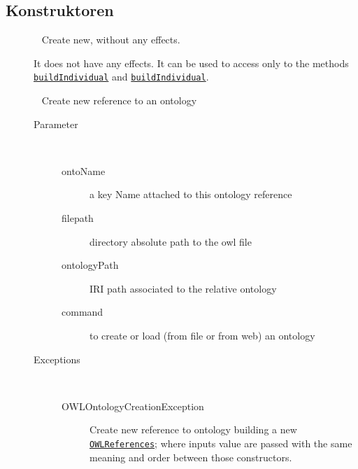 \subsection{Konstruktoren}
\begin{description}
\item[{\label{ontologyFramework.OFRunning.OFInitialising.OFInitialiser()}}]
~ Create new, without any effects.
 
 It does not have any effects. It can be used to access only to the methods
 \texttt{\hyperlink{ontologyFramework.OFRunning.OFInitialising.OFInitialiser.buildIndividual(java.lang.String,ontologyFramework.OFContextManagement.OWLReferences)}{buildIndividual}} and \texttt{\hyperlink{ontologyFramework.OFRunning.OFInitialising.OFInitialiser.buildIndividual(org.semanticweb.owlapi.model.OWLNamedIndividual,ontologyFramework.OFContextManagement.OWLReferences)}{buildIndividual}}.
\item[{\label{ontologyFramework.OFRunning.OFInitialising.OFInitialiser(java.lang.String,java.lang.String,java.lang.String,int)}}]
~ Create new reference to an ontology
\begin{description}
\item[Parameter] ~
\begin{description}
\item[ontoName]
a key Name attached to this ontology reference
\item[filepath]
directory absolute path to the owl file
\item[ontologyPath]
IRI path associated to the relative ontology
\item[command]
to create or load (from file or from web) an ontology
\end{description}
\item[Exceptions] ~
\begin{description}
\item[OWLOntologyCreationException]
\par 
 Create new reference to ontology building a new \texttt{\hyperlink{ontologyFramework.OFContextManagement.OWLReferences(java.lang.String,java.lang.String,java.lang.String,int)}{OWLReferences}};
 where inputs value are passed with the same meaning and order between those constructors.
\end{description}
\end{description}
\end{description}
